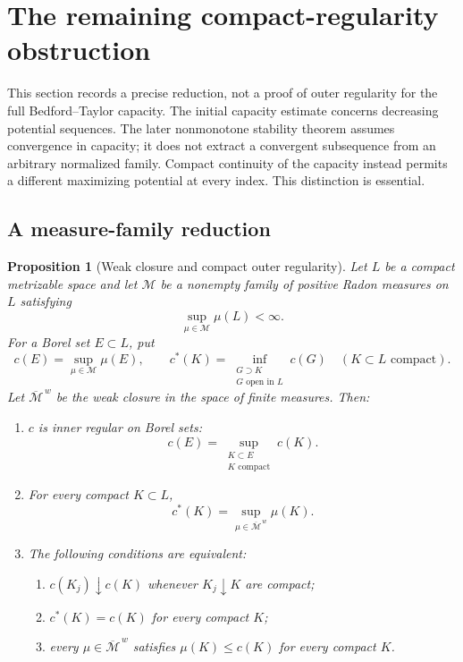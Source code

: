 \documentclass[11pt,a4paper]{article}
\numberwithin{equation}{section}
\newtheorem{proposition}[theorem]{Proposition}
\theoremstyle{definition}
\theoremstyle{remark}
\begin{document}


\section{The remaining compact-regularity obstruction}
\label{sec:outer-regularity-attempt}

This section records a precise reduction, not a proof of outer
regularity for the full Bedford--Taylor capacity. The initial capacity estimate concerns decreasing potential sequences.
The later nonmonotone stability theorem assumes convergence in capacity;
it does not extract a convergent subsequence from an arbitrary normalized
family. Compact continuity of the capacity instead permits a different
maximizing potential at every index. This distinction is essential.

\subsection{A measure-family reduction}

\begin{proposition}[Weak closure and compact outer regularity]
\label{prop:capacity-weak-closure}
Let $L$ be a compact metrizable space and let $\mathcal M$ be a
nonempty family of positive Radon measures on $L$ satisfying
\[
 \sup_{\mu\in\mathcal M}\mu(L)<\infty.
\]
For a Borel set $E\subset L$, put
\[
 c(E)=\sup_{\mu\in\mathcal M}\mu(E),
 \qquad
 c^*(K)=\inf_{\substack{G\supset K\\G\text{ open in }L}}c(G)
 \quad(K\subset L\text{ compact}).
\]
Let $\overline{\mathcal M}^{\,w}$ be the weak closure in the space
of finite measures. Then:
\begin{enumerate}
\item $c$ is inner regular on Borel sets:
\[
 c(E)=\sup_{\substack{K\subset E\\K\text{ compact}}}c(K).
\]
\item For every compact $K\subset L$,
\begin{equation}
\label{eq:compact-capacity-closure}
 c^*(K)=\sup_{\mu\in\overline{\mathcal M}^{\,w}}\mu(K).
\end{equation}
\item The following conditions are equivalent:
\begin{enumerate}
\item $c(K_j)\downarrow c(K)$ whenever $K_j\downarrow K$ are compact;
\item $c^*(K)=c(K)$ for every compact $K$;
\item every $\mu\in\overline{\mathcal M}^{\,w}$ satisfies
      $\mu(K)\leq c(K)$ for every compact $K$.
\end{enumerate}
\end{enumerate}
\end{proposition}
\end{document}

